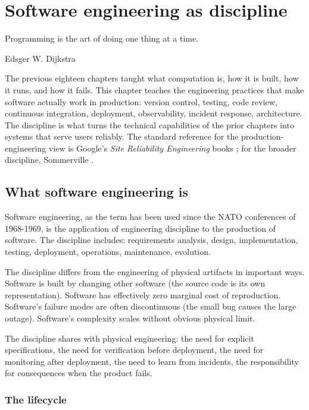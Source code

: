 \chapter{Software engineering as discipline}
\label{vol07:ch19}

\epigraph{Programming is the art of doing one thing at a time.}{Edsger W. Dijkstra}


\noindent
The previous eighteen chapters taught what computation is, how it is built, how it runs, and how it fails. This chapter teaches the engineering practices that make software actually work in production: version control, testing, code review, continuous integration, deployment, observability, incident response, architecture. The discipline is what turns the technical capabilities of the prior chapters into systems that serve users reliably. The standard reference for the production-engineering view is Google's \emph{Site Reliability Engineering} books \cite{text:google-sre}; for the broader discipline, Sommerville \cite{text:sommerville}.

\section{What software engineering is}

Software engineering, as the term has been used since the NATO conferences of 1968-1969, is the application of engineering discipline to the production of software. The discipline includes: requirements analysis, design, implementation, testing, deployment, operations, maintenance, evolution.

The discipline differs from the engineering of physical artifacts in important ways. Software is built by changing other software (the source code is its own representation). Software has effectively zero marginal cost of reproduction. Software's failure modes are often discontinuous (the small bug causes the large outage). Software's complexity scales without obvious physical limit.

The discipline shares with physical engineering: the need for explicit specifications, the need for verification before deployment, the need for monitoring after deployment, the need to learn from incidents, the responsibility for consequences when the product fails.

\subsection{The lifecycle}


